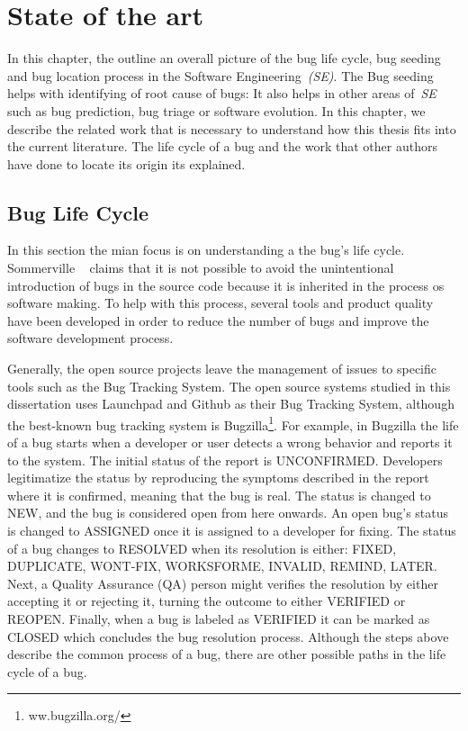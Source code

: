 \documentclass[a4paper, 12pt]{book}
\begin{document}
\cleardoublepage
\chapter{State of the art}
\label{chap:stateoftheart}
In this chapter, the outline an overall picture of the bug life cycle, bug seeding and bug location process in the Software Engineering~\emph{(SE)}. The Bug seeding helps with identifying of root cause of bugs: It also helps in other areas of~\emph{SE} such as bug prediction, bug triage or software evolution. In this chapter, we describe the related work that is necessary to understand how this thesis fits into the current literature. The life cycle of a bug and the work that other authors have done to locate its origin its explained.

\section{Bug Life Cycle}
\label{subsec:buglife}
In this section the mian focus is on understanding a the bug's life cycle. Sommerville ~\cite{sommerville2010software} claims that it is not possible to avoid the unintentional introduction of bugs in the source code because it is inherited in the process os software making. To help with this process, several tools and product quality have been developed in order to reduce the number of bugs and improve the software development process.

Generally, the open source projects leave the management of issues to specific tools such as the Bug Tracking System. The open source systems studied in this dissertation uses Launchpad and Github as their Bug Tracking System, although the best-known bug tracking system is Bugzilla\footnote{ww.bugzilla.org/}. For example, in Bugzilla the life of a bug starts when a developer or user detects a wrong behavior and reports it to the system. The initial status of the report is UNCONFIRMED. Developers legitimatize the status by reproducing the symptoms described in the report where it is confirmed, meaning that the bug is real. The status is changed to NEW, and the bug is considered open from here onwards. An open bug's status is changed to ASSIGNED once it is assigned to a developer for fixing. The status of a bug changes to RESOLVED when its resolution is either: FIXED, DUPLICATE, WONT-FIX, WORKSFORME, INVALID, REMIND, LATER. Next, a Quality Assurance (QA) person might verifies the resolution by either accepting it or rejecting it, turning the outcome to either VERIFIED or REOPEN. Finally, when a bug is labeled as VERIFIED it can be marked as CLOSED which concludes the bug resolution process. Although the steps above describe the common process of a bug, there are other possible paths in the life cycle of a bug.
\end{document}
